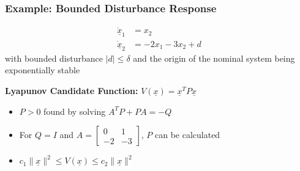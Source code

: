 \documentclass[student, noshadow, lsr, english, aspectratio=169, t]{ITR_LSR_slides}
\begin{document}
\begin{frame}
    \frametitle{Example: Bounded Disturbance Response}
	\vspace{-0.5cm}
    \begin{tcolorbox}[title=Problem: Analyze Boundedness of a Perturbed Mass-Spring-Damper-System]
		\vspace{-0.4cm}
        \begin{align*}
            \dot{\underline{x}}_1 &= x_2 \\ %
            \dot{\underline{x}}_2 &= -2x_1 - 3x_2 + d
        \end{align*}
        with bounded disturbance $|d| \leq \delta$ and the origin of the nominal system being exponentially stable
    \end{tcolorbox}

    \vspace{0.3cm}
    \textbf{Lyapunov Candidate Function:} $V(\underline{x}) = \underline{x}^T P \underline{x}$
    \begin{itemize}
        \item $P > 0$ found by solving $A^T P + P A = -Q$
        \item For $Q=I$ and $A = \begin{bmatrix} 0 & 1 \\ -2 & -3 \end{bmatrix}$, $P$ can be calculated
        \item $c_1 \|\underline{x}\|^2 \leq V(\underline{x}) \leq c_2 \|\underline{x}\|^2$
    \end{itemize}

\end{frame}
\end{document}
